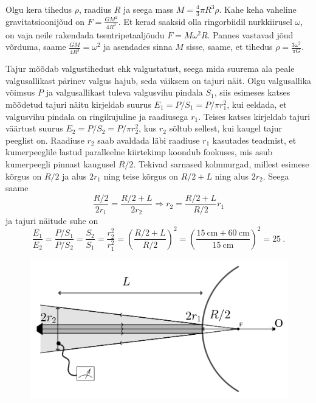 \documentclass[10pt]{article}
\begin{document}

\solu
Olgu kera tihedus $\rho$, raadius $R$ ja seega mass $M = \frac{4}{3}\pi R^3 \rho$. Kahe keha vaheline gravitatsioonijõud on $F = \frac{G M^2}{4R^2}$. Et kerad saaksid olla ringorbiidil nurkkiirusel $\omega$, on vaja neile rakendada tsentripetaaljõudu $F = M \omega^2 R$. Pannes vastavad jõud võrduma, saame $\frac{G M}{4 R^3} = \omega^2$ ja asendades sinna $M$ sisse, saame, et tihedus $\rho = \frac{3\omega^2}{\pi G}$.
\probend
\bigskip


\solu
Tajur mõõdab valgustihedust ehk valgustatust, seega mida suurema ala peale valgusallikast pärinev valgus hajub, seda väiksem on tajuri näit. Olgu valgusallika võimsus $P$ ja valgusallikast tuleva valgusvihu pindala $S_1$, siis esimeses katses mõõdetud tajuri näitu kirjeldab suurus $E_1 = P/S_1 = P/\pi r_1^2$, kui eeldada, et valgusvihu pindala on ringikujuline ja raadiusega $r_1$. Teises katses kirjeldab tajuri väärtust suurus $E_2 = P/S_2 = P/\pi r_2^2$, kus $r_2$ sõltub sellest, kui kaugel tajur peeglist on. Raadiuse $r_2$ saab avaldada läbi raadiuse $r_1$ kasutades teadmist, et kumerpeeglile lastud paralleelne kiirtekimp koondub fookuses, mis asub kumerpeegli pinnast kaugusel $R/2$. Tekivad sarnased kolmnurgad, millest esimese kõrgus on $R/2$ ja alus $2r_1$ ning teise kõrgus on $R/2 + L$ ning alus $2r_2$. Seega saame
$$ \frac{R/2}{2r_1} = \frac{R/2 + L}{2r_2} \Rightarrow r_2 = \frac{R/2 + L}{R/2} r_1$$
ja tajuri näitude suhe on
$$ \frac{E_1}{E_2} = \frac{P/S_1}{P/S_2} = \frac{S_2}{S_1} = \frac{r_2^2}{r_1^2} = \left(\frac{R/2 + L}{R/2}\right)^2 = \left(\frac{\SI{15}{\centi\meter} + \SI{60}{\centi\meter}}{\SI{15}{\centi\meter}}\right)^2 = 25 \ .$$

\begin{figure}[h]
    \centering
    \includegraphics[width=0.6\linewidth]{2024-v2g-02-yl.png}
\end{figure}
\probend
\bigskip
\end{document}
